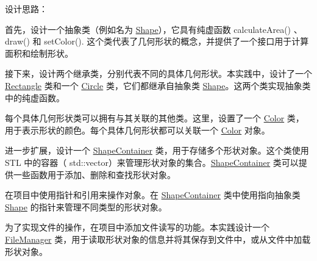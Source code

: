 设计思路：
\begin{DoxyItemize}
\item 首先，设计一个抽象类（例如名为 {\ttfamily \mbox{\hyperlink{classShape}{Shape}}}），它具有纯虚函数 {\ttfamily calculate\+Area()} 、 {\ttfamily draw()} 和 {\ttfamily set\+Color()}. 这个类代表了几何形状的概念，并提供了一个接口用于计算面积和绘制形状。
\item 接下来，设计两个继承类，分别代表不同的具体几何形状。本实践中，设计了一个 {\ttfamily \mbox{\hyperlink{classRectangle}{Rectangle}}} 类和一个 {\ttfamily \mbox{\hyperlink{classCircle}{Circle}}} 类，它们都继承自抽象类 {\ttfamily \mbox{\hyperlink{classShape}{Shape}}}。这两个类实现抽象类中的纯虚函数。
\item 每个具体几何形状类可以拥有与其关联的其他类。这里，设置了一个 {\ttfamily \mbox{\hyperlink{classColor}{Color}}} 类，用于表示形状的颜色。每个具体几何形状都可以关联一个 {\ttfamily \mbox{\hyperlink{classColor}{Color}}} 对象。
\item 进一步扩展，设计一个 {\ttfamily \mbox{\hyperlink{classShapeContainer}{Shape\+Container}}} 类，用于存储多个形状对象。这个类使用 S\+TL 中的容器（ {\ttfamily std\+::vector}）来管理形状对象的集合。{\ttfamily \mbox{\hyperlink{classShapeContainer}{Shape\+Container}}} 类可以提供一些函数用于添加、删除和查找形状对象。
\item 在项目中使用指针和引用来操作对象。在 {\ttfamily \mbox{\hyperlink{classShapeContainer}{Shape\+Container}}} 类中使用指向抽象类 {\ttfamily \mbox{\hyperlink{classShape}{Shape}}} 的指针来管理不同类型的形状对象。
\item 为了实现文件的操作，在项目中添加文件读写的功能。本实践设计一个 {\ttfamily \mbox{\hyperlink{classFileManager}{File\+Manager}}} 类，用于读取形状对象的信息并将其保存到文件中，或从文件中加载形状对象。 
\end{DoxyItemize}